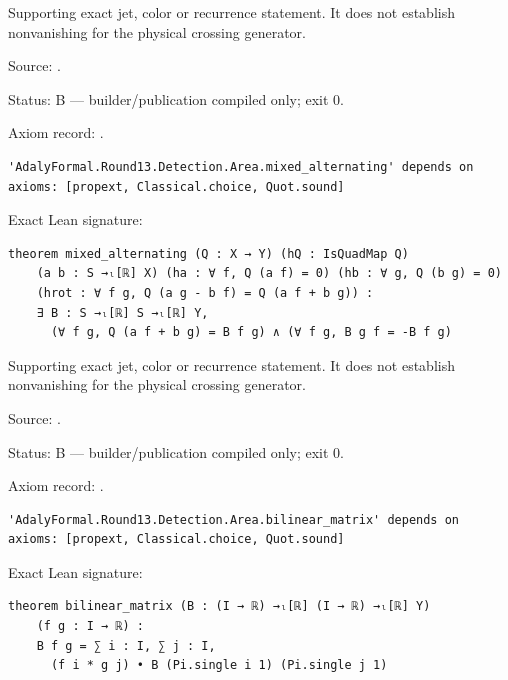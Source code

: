 \begin{theorem}[bp-514]
\label{bp-514}
\leanok
Supporting exact jet, color or recurrence statement. It does not establish nonvanishing for the physical crossing generator.

\par Source: \texttt{}.
\par Status: B — builder/publication compiled only; exit 0.
\par Axiom record: \texttt{}.
\begin{verbatim}
'AdalyFormal.Round13.Detection.Area.mixed_alternating' depends on axioms: [propext, Classical.choice, Quot.sound]
\end{verbatim}
\par Exact Lean signature:
\begin{verbatim}
theorem mixed_alternating (Q : X → Y) (hQ : IsQuadMap Q)
    (a b : S →ₗ[ℝ] X) (ha : ∀ f, Q (a f) = 0) (hb : ∀ g, Q (b g) = 0)
    (hrot : ∀ f g, Q (a g - b f) = Q (a f + b g)) :
    ∃ B : S →ₗ[ℝ] S →ₗ[ℝ] Y,
      (∀ f g, Q (a f + b g) = B f g) ∧ (∀ f g, B g f = -B f g)
\end{verbatim}
\end{theorem}

\begin{theorem}[bp-515]
\label{bp-515}
\uses{}
\leanok
Supporting exact jet, color or recurrence statement. It does not establish nonvanishing for the physical crossing generator.

\par Source: \texttt{}.
\par Status: B — builder/publication compiled only; exit 0.
\par Axiom record: \texttt{}.
\begin{verbatim}
'AdalyFormal.Round13.Detection.Area.bilinear_matrix' depends on axioms: [propext, Classical.choice, Quot.sound]
\end{verbatim}
\par Exact Lean signature:
\begin{verbatim}
theorem bilinear_matrix (B : (I → ℝ) →ₗ[ℝ] (I → ℝ) →ₗ[ℝ] Y)
    (f g : I → ℝ) :
    B f g = ∑ i : I, ∑ j : I,
      (f i * g j) • B (Pi.single i 1) (Pi.single j 1)
\end{verbatim}
\end{theorem}

